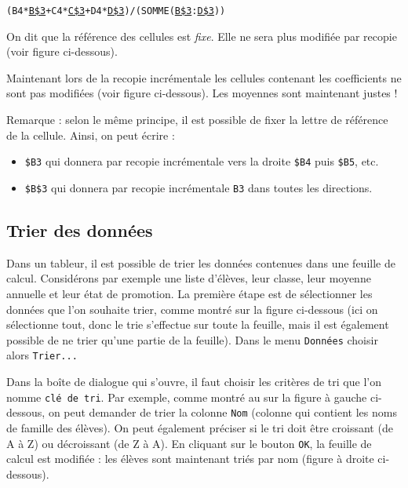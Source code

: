 \begin{center}\texttt{(B4*\underline{B\$3}+C4*\underline{C\$3}+D4*\underline{D\$3})/(SOMME(\underline{B\$3}:\underline{D\$3}))}\end{center}

On dit que la référence des cellules est \emph{fixe}. Elle ne sera plus modifiée par recopie (voir figure ci-dessous).


Maintenant lors de la recopie incrémentale les cellules contenant les coefficients ne sont pas modifiées (voir figure ci-dessous). Les moyennes sont maintenant justes !



Remarque : selon le même principe, il est possible de fixer la lettre de référence de la cellule. Ainsi, on peut écrire :

\begin{itemize}
\item \texttt{\$B3} qui donnera par recopie incrémentale vers la droite \texttt{\$B4} puis \texttt{\$B5}, etc.
\item \texttt{\$B\$3} qui donnera par recopie incrémentale \texttt{B3} dans toutes les directions.
\end{itemize}

\subsection{Trier des données}\label{Calc3tri} 

Dans un tableur, il est possible de trier les données contenues dans une feuille de calcul. Considérons par exemple une liste d'élèves, leur classe, leur moyenne annuelle et leur état de promotion. La première étape est de sélectionner les données que l'on souhaite trier, comme montré sur la figure ci-dessous (ici on sélectionne tout, donc le trie s'effectue sur toute la feuille, mais il est également possible de ne trier qu'une partie de la feuille). Dans le menu \texttt{Données} choisir alors \texttt{Trier...}


Dans la boîte de dialogue qui s'ouvre, il faut choisir les critères de tri que l'on nomme \texttt{clé de tri}. Par exemple, comme montré au  sur la figure à gauche ci-dessous, on peut demander de trier la colonne \texttt{Nom} (colonne qui contient les noms de famille des élèves). On peut également préciser  si le tri doit être croissant (de A à Z) ou décroissant (de Z à A). En cliquant sur le bouton \texttt{OK}, la feuille de calcul est modifiée : les élèves sont maintenant triés par nom (figure à droite ci-dessous).

